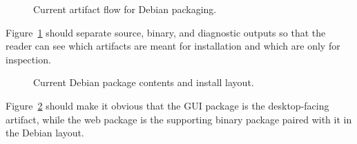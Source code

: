 \begin{figure}[htbp]
\centering
\caption{Current artifact flow for Debian packaging.}
\label{fig:packaging-artifact-flow}
\end{figure}

Figure~\ref{fig:packaging-artifact-flow} should separate source, binary, and
diagnostic outputs so that the reader can see which artifacts are meant for
installation and which are only for inspection.

\begin{figure}[htbp]
\centering
\caption{Current Debian package contents and install layout.}
\label{fig:packaging-package-layout}
\end{figure}

Figure~\ref{fig:packaging-package-layout} should make it obvious that the GUI
package is the desktop-facing artifact, while the web package is the supporting
binary package paired with it in the Debian layout.


